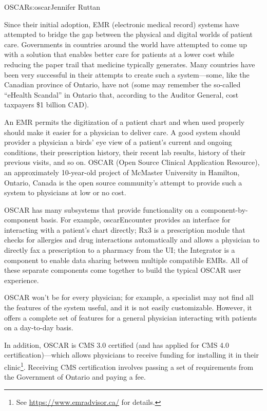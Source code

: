 \begin{aosachapter}{OSCAR}{s:oscar}{Jennifer Ruttan}

Since their initial adoption, EMR (electronic medical record) systems
have attempted to bridge the gap between the physical and digital
worlds of patient care. Governments in countries around the world have
attempted to come up with a solution that enables better care for
patients at a lower cost while reducing the paper trail that medicine
typically generates. Many countries have been very successful in their
attempts to create such a system---some, like the Canadian province of
Ontario, have not (some may remember the so-called ``eHealth Scandal''
in Ontario that, according to the Auditor General, cost taxpayers \$1
billion CAD).

An EMR permits the digitization of a patient chart and when used
properly should make it easier for a physician to deliver care. A good
system should provider a physician a birds' eye view of a patient's
current and ongoing conditions, their prescription history, their
recent lab results, history of their previous visits, and so on. OSCAR
(Open Source Clinical Application Resource), an approximately
10-year-old project of McMaster University in Hamilton, Ontario,
Canada is the open source community's attempt to provide such a system
to physicians at low or no cost.

OSCAR has many subsystems that provide functionality on a
component-by-component basis. For example, oscarEncounter provides an
interface for interacting with a patient's chart directly; Rx3 is a
prescription module that checks for allergies and drug interactions
automatically and allows a physician to directly fax a prescription to
a pharmacy from the UI; the Integrator is a component to enable data
sharing between multiple compatible EMRs. All of these separate
components come together to build the typical OSCAR user experience.

OSCAR won't be for every physician; for example, a specialist may not
find all the features of the system useful, and it is not easily
customizable. However, it offers a complete set of features for a
general physician interacting with patients on a day-to-day basis.

In addition, OSCAR is CMS 3.0 certified (and has applied for CMS 4.0
certification)---which allows physicians to receive funding for
installing it in their
clinic\footnote{See \url{https://www.emradvisor.ca/} for
details.}. Receiving CMS certification involves passing a set of
requirements from the Government of Ontario and paying a fee.


\end{aosachapter}
